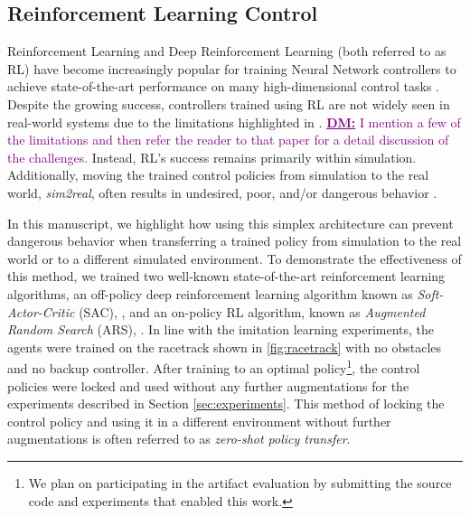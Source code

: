 \documentclass[manuscript,screen,review]{acmart}
\newcommand{\diego}[1]{\textcolor{purple}{\textbf{\underline{DM:}} #1}}
\begin{document}



\subsection{Reinforcement Learning Control}
Reinforcement Learning and Deep Reinforcement Learning (both referred to as RL) have become increasingly popular for training Neural Network controllers to achieve state-of-the-art performance on many high-dimensional control tasks \cite{lillicrap2015continuous, schulman2017proximal, mania2018simple, haarnoja2018soft}. Despite the growing success, controllers trained using RL are not widely seen in real-world systems due to the limitations highlighted in \cite{dulac2019challenges}. \diego{I mention a few of the limitations and then refer the reader to that paper for a detail discussion of the challenges.} Instead, RL's success remains primarily within simulation. Additionally, moving the trained control policies from simulation to the real world, \emph{sim2real}, often results in undesired, poor, and/or dangerous behavior \cite{jang2019ICCPS, kadian2019we}.

In this manuscript, we highlight how using this simplex architecture can prevent dangerous behavior when transferring a trained policy from simulation to the real world or to a different simulated environment.
To demonstrate the effectiveness of this method, we trained  two well-known state-of-the-art reinforcement learning algorithms, an off-policy deep reinforcement learning algorithm known as \emph{Soft-Actor-Critic} (SAC), \cite{haarnoja2018soft}, and an on-policy RL algorithm, known as \emph{Augmented Random Search} (ARS), \cite{mania2018simple}. %
In line with the imitation learning experiments, the agents were trained on the racetrack shown in \ref{fig:racetrack} with no obstacles and no backup controller. After training to an optimal policy\footnote{We plan on participating in the artifact evaluation by submitting the source code and experiments that enabled this work.}, the control policies were locked and used without any further augmentations for the experiments described in Section \ref{sec:experiments}. This method of locking the control policy and using it in a different environment without further augmentations is often referred to as \emph{zero-shot policy transfer}.
\end{document}
